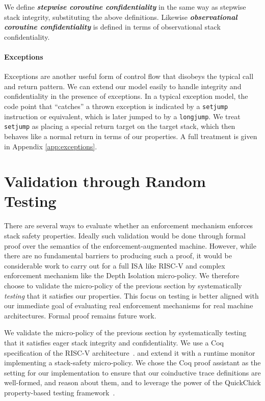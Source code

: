 \documentclass[10pt,conference]{ieeetran}%
\theoremstyle{definition}
\begin{document}
{
We define \textbf{\em stepwise coroutine confidentiality} in the same way as stepwise stack
integrity, substituting the above definitions. Likewise
\textbf{\em observational coroutine confidentiality} is defined in terms of observational
stack confidentiality.

\medskip

\paragraph*{Exceptions}

Exceptions are another useful form of control flow that disobeys the typical call and return pattern.
We can extend our model easily to handle integrity and confidentiality in the presence of exceptions.
In a typical exception model, the code point that ``catches'' a thrown exception is indicated by a {\tt setjump}
instruction or equivalent, which is later jumped to by a {\tt longjump}. We treat {\tt setjump} as placing
a special return target on the target stack, which then behaves like a normal return in terms of our properties.
A full treatment is given in Appendix \ref{app:exceptions}.

\section{Validation through Random Testing}
\label{sec:testing}

There are several ways to evaluate whether an enforcement mechanism enforces
stack safety properties. Ideally such validation would be done through formal proof over
the semantics of the enforcement-augmented machine.
However, while there are no fundamental barriers to producing such a proof,
it would be considerable work to carry out for a full ISA like RISC-V and
complex enforcement mechanism like the Depth Isolation micro-policy.
We therefore choose to validate the micro-policy of the previous section by
systematically \emph{testing} that it satisfies our properties.
This focus on testing is better aligned with our immediate
goal of evaluating real enforcement mechanisms for real machine architectures.
Formal proof remains future work.

We validate the micro-policy of the previous section by
systematically testing that it satisfies eager stack integrity and
confidentiality. We use a Coq specification of the RISC-V
architecture~\cite{Bourgeat2021AMF}.
and extend it with a runtime monitor implementing a stack-safety
micro-policy. We chose the Coq proof assistant as the setting for our implementation
to ensure that our coinductive trace definitions are well-formed, and reason about
them, and to leverage the power of the QuickChick property-based testing framework~\cite{Pierce:SF4}.

}
\end{document}
